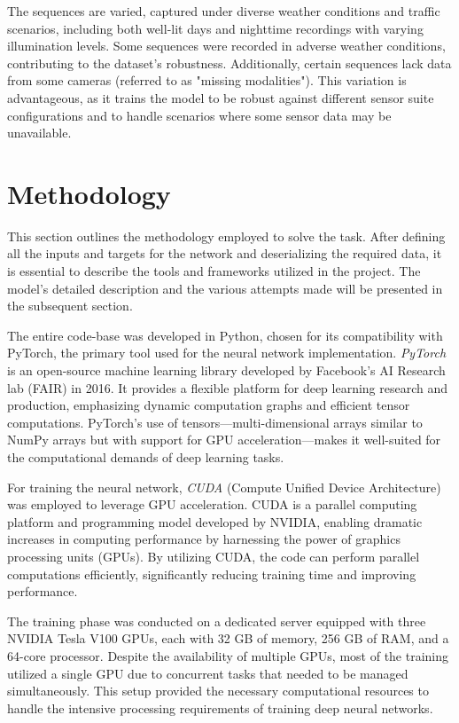 The sequences are varied, captured under diverse weather conditions and traffic scenarios, including both well-lit days and nighttime recordings with varying illumination levels. Some sequences were recorded in adverse weather conditions, contributing to the dataset's robustness. Additionally, certain sequences lack data from some cameras (referred to as "missing modalities"). This variation is advantageous, as it trains the model to be robust against different sensor suite configurations and to handle scenarios where some sensor data may be unavailable.

\section{Methodology}

This section outlines the methodology employed to solve the task. After defining all the inputs and targets for the network and deserializing the required data, it is essential to describe the tools and frameworks utilized in the project. The model's detailed description and the various attempts made will be presented in the subsequent section.

The entire code-base was developed in Python, chosen for its compatibility with PyTorch, the primary tool used for the neural network implementation. \textit{PyTorch} is an open-source machine learning library developed by Facebook's AI Research lab (FAIR) in 2016. It provides a flexible platform for deep learning research and production, emphasizing dynamic computation graphs and efficient tensor computations. PyTorch's use of tensors—multi-dimensional arrays similar to NumPy arrays but with support for GPU acceleration—makes it well-suited for the computational demands of deep learning tasks.

For training the neural network, \textit{CUDA} (Compute Unified Device Architecture) was employed to leverage GPU acceleration. CUDA is a parallel computing platform and programming model developed by NVIDIA, enabling dramatic increases in computing performance by harnessing the power of graphics processing units (GPUs). By utilizing CUDA, the code can perform parallel computations efficiently, significantly reducing training time and improving performance.

The training phase was conducted on a dedicated server equipped with three NVIDIA Tesla V100 GPUs, each with 32 GB of memory, 256 GB of RAM, and a 64-core processor. Despite the availability of multiple GPUs, most of the training utilized a single GPU due to concurrent tasks that needed to be managed simultaneously. This setup provided the necessary computational resources to handle the intensive processing requirements of training deep neural networks.